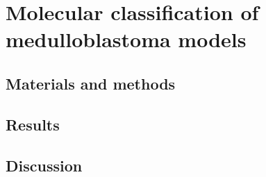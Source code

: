 \chapter{Molecular classification of medulloblastoma models}
\label{ch:mmu-mb-class}

\section{Materials and methods}

\section{Results}

\section{Discussion}
